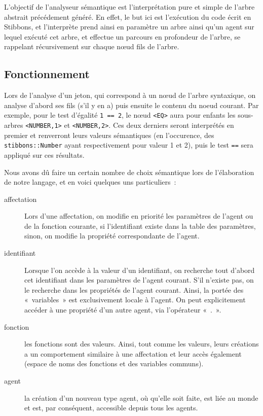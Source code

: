 L'objectif de l'analyseur sémantique est l'interprétation pure et simple de l'arbre abstrait précédement généré. En effet, le but ici est l'exécution du code écrit en Stibbons, et l'interprète prend ainsi en paramètre un arbre ainsi qu'un agent sur lequel exécuté cet arbre, et effectue un parcours en profondeur de l'arbre, se rappelant récursivement sur chaque nœud fils de l'arbre. 

\subsection{Fonctionnement}
Lors de l'analyse d'un jeton, qui correspond à un nœud de l'arbre syntaxique, on analyse d'abord ses fils (s'il y en a) puis ensuite le contenu du noeud courant.
Par exemple, pour le test d'égalité \verb|1 == 2|, le nœud \verb|<EQ>| aura pour enfants les sous-arbres \verb|<NUMBER,1>| et \verb|<NUMBER,2>|. Ces deux derniers seront interprétés en premier et renverront leurs valeurs sémantiques (en l'occurence, des \verb|stibbons::Number| ayant respectivement pour valeur 1 et 2), puis le test \verb|==| sera appliqué sur ces résultats.

Nous avons dû faire un certain nombre de choix sémantique lors de l'élaboration de notre langage, et en voici quelques uns particuliers~:
\begin{description}
\item[affectation] Lors d'une affectation, on modifie en priorité les paramètres de l'agent ou de la fonction courante, si l'identifiant existe dans la table des paramètres, sinon, on modifie la propriété correspondante de l'agent.
\item[identifiant] Lorsque l'on accède à la valeur d'un identifiant, on recherche tout d'abord cet identifiant dans les paramètres de l'agent courant. S'il n'existe pas, on le recherche dans les propriétés de l'agent courant. Ainsi, la portée des «~variables~» est exclusivement locale à l'agent. On peut explicitement accéder à une propriété d'un autre agent, via l'opérateur «~.~».
\item[fonction] les fonctions sont des valeurs. Ainsi, tout comme les valeurs, leurs créations a un comportement similaire à une affectation et leur accès également (espace de noms des fonctions et des variables communs).
\item[agent] la création d'un nouveau type agent, où qu'elle soit faite, est liée au monde et est, par conséquent, accessible depuis tous les agents.
\end{description}

